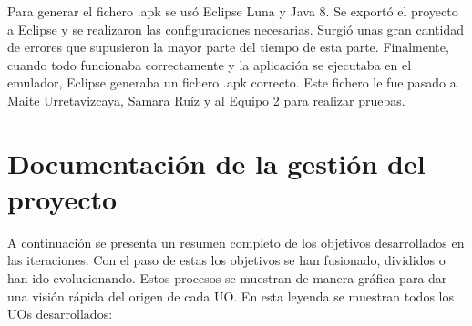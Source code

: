 Para generar el fichero .apk se usó Eclipse Luna y Java 8. Se exportó el proyecto a Eclipse y se realizaron las configuraciones necesarias. Surgió unas gran cantidad de errores que supusieron la mayor parte del tiempo de esta parte. Finalmente, cuando todo funcionaba correctamente y la aplicación se ejecutaba en el emulador, Eclipse generaba un fichero .apk correcto. Este fichero le fue pasado a Maite Urretavizcaya, Samara Ruíz y al Equipo 2 para realizar pruebas.\\


\section{Documentación de la gestión del proyecto}
\label{dgp}

A continuación se presenta un resumen completo de los objetivos desarrollados en las iteraciones. Con el paso de estas los objetivos se han fusionado, divididos o han ido evolucionando. Estos procesos se muestran de manera gráfica para dar una visión rápida del origen de cada UO. En esta leyenda se muestran todos los UOs desarrollados:\\

\noindent
{}\\

\noindent
{}\\

